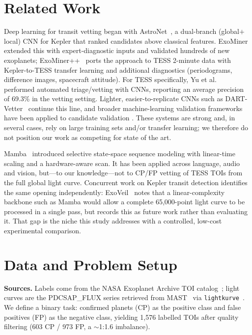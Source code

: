 \documentclass[conference]{IEEEtran}
\begin{document}
\section{Related Work}

Deep learning for transit vetting began with AstroNet~\cite{shallue2018}, a
dual-branch (global$+$local) CNN for Kepler that ranked candidates above
classical features. ExoMiner~\cite{valizadegan2022} extended this with
expert-diagnostic inputs and validated hundreds of new exoplanets;
ExoMiner++~\cite{exominerpp} ports the approach to TESS 2-minute data with
Kepler-to-TESS transfer learning and additional diagnostics (periodograms,
difference images, spacecraft attitude). For TESS specifically,
Yu et al.~\cite{yu2019} performed automated triage/vetting with CNNs, reporting an
average precision of 69.3\% in the vetting setting. Lighter, easier-to-replicate
CNNs such as DART-Vetter~\cite{dartvetter} continue this line, and broader
machine-learning validation frameworks have been applied to candidate validation
\cite{armstrong2020}. These systems are strong and, in several cases, rely on
large training sets and/or transfer learning; we therefore do not position our
work as competing for state of the art.

Mamba~\cite{gu2023mamba} introduced selective state-space sequence modeling with
linear-time scaling and a hardware-aware scan. It has been applied across
language, audio and vision, but---to our knowledge---not to CP/FP vetting of TESS
TOIs from the full global light curve. Concurrent work on Kepler transit detection
identifies the same opening independently: ExoVeil~\cite{exoveil} notes that a
linear-complexity backbone such as Mamba would allow a complete 65{,}000-point
light curve to be processed in a single pass, but records this as future work
rather than evaluating it. That gap is the niche this study addresses with a
controlled, low-cost experimental comparison.

\section{Data and Problem Setup}

\textbf{Sources.} Labels come from the NASA Exoplanet Archive TOI
catalog~\cite{toi,guerrero2021}; light curves are the PDCSAP\_FLUX series
retrieved from MAST~\cite{mast} via \texttt{lightkurve}~\cite{lightkurve}. We define a binary
task: confirmed planets (CP) as the positive class and false positives (FP) as the
negative class, yielding 1{,}576 labelled TOIs after quality filtering (603 CP /
973 FP, a $\sim$1{:}1.6 imbalance).
\end{document}
